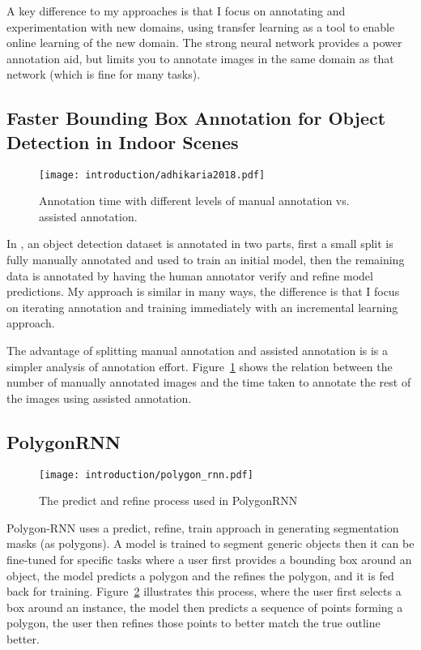 A key difference to my approaches is that I focus on annotating and experimentation with new domains, using transfer learning as a tool to enable online learning of the new domain. The strong neural network provides a power annotation aid, but limits you to annotate images in the same domain as that network (which is fine for many tasks).

\subsection{Faster Bounding Box Annotation for Object Detection in Indoor Scenes}

\begin{figure}[h]
  \centering
  \texttt{[image: introduction/adhikaria2018.pdf]}
  \caption{Annotation time with different levels of manual annotation vs. assisted annotation. \cite{Adhikaria2018}}  
  \label{fig:adhikaria2018}
\end{figure}

In \cite{Adhikaria2018}, an object detection dataset is annotated in two parts, first a small split is fully manually annotated and used to train an initial model, then the remaining data is annotated by having the human annotator verify and refine model predictions. My approach is similar in many ways, the difference is that I focus on iterating annotation and training immediately with an incremental learning approach.

The advantage of splitting manual annotation and assisted annotation is is a simpler analysis of annotation effort. Figure~\ref{fig:adhikaria2018} shows the relation between the number of manually annotated images and the time taken to annotate the rest of the images using assisted annotation.



\subsection {PolygonRNN \cite{Castrejon2017}}

\begin{figure}[h]
  \centering
  \texttt{[image: introduction/polygon\_rnn.pdf]}
  \caption{The predict and refine process used in PolygonRNN \cite{Castrejon2017}}  
  \label{fig:polygon_rnn}
\end{figure}


Polygon-RNN \cite{Castrejon2017} uses a predict, refine, train approach in generating segmentation masks (as polygons). A model is trained to segment generic objects then it can be fine-tuned for specific tasks where a user first provides a bounding box around an object, the model predicts a polygon and the refines the polygon, and it is fed back for training. Figure~\ref{fig:polygon_rnn} illustrates this process, where the user first selects a box around an instance, the model then predicts a sequence of points forming a polygon, the user then refines those points to better match the true outline better.

